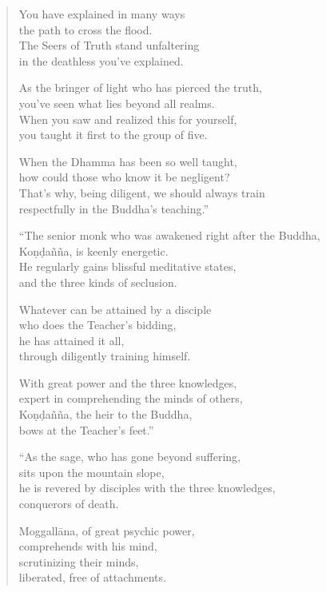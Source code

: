 \documentclass[12pt,openany]{book}%
\begin{document}
\begin{verse}
You have explained in many ways \\
the path to cross the flood. \\
The Seers of Truth stand unfaltering \\
in the deathless you’ve explained. 

As the bringer of light who has pierced the truth, \\
you’ve seen what lies beyond all realms. \\
When you saw and realized this for yourself, \\
you taught it first to the group of five. 

When the Dhamma has been so well taught, \\
how could those who know it be negligent? \\
That’s why, being diligent, we should always train \\
respectfully in the Buddha’s teaching.” 

“The senior monk who was awakened right after the Buddha, \\
\textsanskrit{Koṇḍañña}, is keenly energetic. \\
He regularly gains blissful meditative states, \\
and the three kinds of seclusion. 

Whatever can be attained by a disciple \\
who does the Teacher’s bidding, \\
he has attained it all, \\
through diligently training himself. 

With great power and the three knowledges, \\
expert in comprehending the minds of others, \\
\textsanskrit{Koṇḍañña}, the heir to the Buddha, \\
bows at the Teacher’s feet.” 

“As the sage, who has gone beyond suffering, \\
sits upon the mountain slope, \\
he is revered by disciples with the three knowledges, \\
conquerors of death. 

\textsanskrit{Moggallāna}, of great psychic power, \\
comprehends with his mind, \\
scrutinizing their minds, \\
liberated, free of attachments. 


\end{verse}
\end{document}
